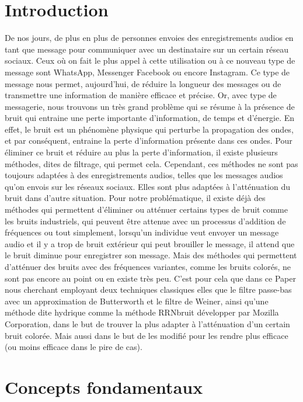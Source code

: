 \documentclass[conference,onecolumn]{IEEEtran}
\begin{document}
\section{Introduction}
De nos jours, de plus en plus de personnes envoies des enregistrements audios en tant que message pour communiquer avec un destinataire sur un certain réseau sociaux. Ceux où on fait le plus appel à cette utilisation ou à ce nouveau type de message sont WhatsApp, Messenger Facebook ou encore Instagram. Ce type de message nous permet, aujourd’hui, de réduire la longueur des messages ou de transmettre une information de manière efficace et précise. Or, avec type de messagerie, nous trouvons un très grand problème qui se résume à la présence de bruit qui entraine une perte importante d’information, de temps et d’énergie. En effet, le bruit est un phénomène physique qui perturbe la propagation des ondes, et par conséquent, entraine la perte d’information présente dans ces ondes. Pour éliminer ce bruit et réduire au plus la perte d’information, il existe plusieurs méthodes, dites de filtrage, qui permet cela. Cependant, ces méthodes ne sont pas toujours adaptées à des enregistrements audios, telles que les messages audios qu’on envois sur les réseaux sociaux. Elles sont plus adaptées à l’atténuation du bruit dans d’autre situation. Pour notre problématique, il existe déjà des méthodes qui permettent d’éliminer ou atténuer certains types de bruit comme les bruits industriels, qui peuvent être attenue avec un processus d’addition de fréquences ou tout simplement, lorsqu’un individue veut envoyer un message audio et il y a trop de bruit extérieur qui peut brouiller le message, il attend que le bruit diminue pour enregistrer son message. Mais des méthodes qui permettent d’atténuer des bruits avec des fréquences variantes, comme les bruits colorés, ne sont pas encore au point ou en existe très peu. C’est pour cela que dans ce Paper nous cherchant employant deux techniques classiques elles que le filtre passe-bas avec un approximation de Butterworth et le filtre de Weiner, ainsi qu’une méthode dite hydrique comme la méthode RRNbruit développer par Mozilla Corporation, dans le but de trouver la plus adapter à l’atténuation d’un certain bruit colorée. Mais aussi dans le but de les modifié pour les rendre plus efficace (ou moins efficace dans le pire de cas).

\section{Concepts fondamentaux}
\end{document}
